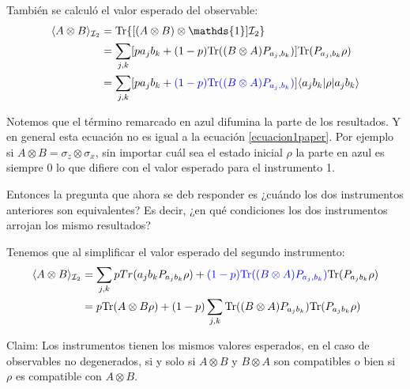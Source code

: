 \documentclass[12pt,oneside]{book}\raggedbottom{}
\begin{document}
También se calculó el valor esperado del observable:
\[\begin{split}
	\la A\otimes B \ra_{\mathcal{I}_2}&=\tr\{[(A\otimes B) \otimes \mathds{1}]\mathcal{I}_2\} \\
	&=\sum_{j,k}[p a_{j}b_k +(1-p)\tr( (B\otimes A)P_{a_j,b_k}) ]\tr(P_{a_j,b_k} \rho)\\
	&=\sum_{j,k}[p a_{j}b_k +{\color{blue}(1-p)\tr( (B\otimes A)P_{a_j,b_k})} ]\la a_j b_k|\rho |a_j b_k\ra \\
\end{split}\]

		Notemos que el término remarcado en azul difumina la parte de los resultados. Y en general esta ecuación no es igual a la ecuación {\ref{ecuacion1paper}}. Por ejemplo si $A\otimes B= \sigma_z\otimes \sigma_x$, sin importar cuál sea el estado inicial $\rho$ la parte en azul es siempre 0 lo que difiere con el valor esperado para el instrumento 1. 


Entonces la pregunta que ahora se deb responder es ¿cuándo los dos instrumentos anteriores son equivalentes? Es decir, ¿en qué condiciones los dos instrumentos arrojan los mismo resultados?

Tenemos que al simplificar el valor esperado del segundo instrumento:
\begin{equation}\label{ExpectedValueI2}\begin{split}\langle A\otimes B \rangle_{\mathcal{I}_2}&=\sum_{j,k} p Tr(a_{j}b_k P_{a_j b_k}\rho)+{\color{blue}(1-p){\rm Tr}( (B\otimes A)P_{a_j,b_k})} {\rm Tr}(P_{a_j b_k}\rho) \\
    &=p{\rm Tr}(A\otimes B \rho)+(1-p)\sum_{j,k}{\rm Tr}((B\otimes A )P_{a_j b_k} ){\rm Tr}(P_{a_j b_k}\rho)
\end{split}\end{equation}


Claim: Los instrumentos tienen los mismos valores esperados, en el caso de observables no degenerados, si y solo si $A\otimes B$ y $B\otimes A$ son compatibles o bien si $\rho $ es compatible con $A\otimes B$.
\end{document}
